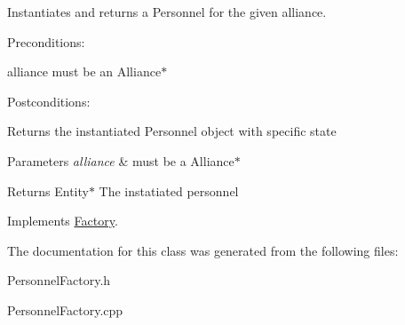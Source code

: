 Instantiates and returns a Personnel for the given alliance. 

Preconditions\+:
\begin{DoxyItemize}
\item alliance must be an Alliance$\ast$
\end{DoxyItemize}

Postconditions\+:
\begin{DoxyItemize}
\item Returns the instantiated Personnel object with specific state
\end{DoxyItemize}


\begin{DoxyParams}{Parameters}
{\em alliance} & must be a Alliance$\ast$ \\
\hline
\end{DoxyParams}
\begin{DoxyReturn}{Returns}
Entity$\ast$ The instatiated personnel 
\end{DoxyReturn}


Implements \hyperlink{classFactory}{Factory}.



The documentation for this class was generated from the following files\+:\begin{DoxyCompactItemize}
\item 
Personnel\+Factory.\+h\item 
Personnel\+Factory.\+cpp\end{DoxyCompactItemize}
